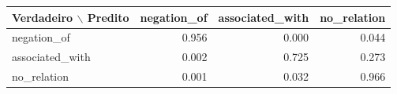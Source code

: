 \begin{tabular}{lrrr}
\toprule
Verdadeiro $\backslash$ Predito & negation\_of & associated\_with & no\_relation \\
\midrule
negation\_of & 0.956 & 0.000 & 0.044 \\
associated\_with & 0.002 & 0.725 & 0.273 \\
no\_relation & 0.001 & 0.032 & 0.966 \\
\bottomrule
\end{tabular}
